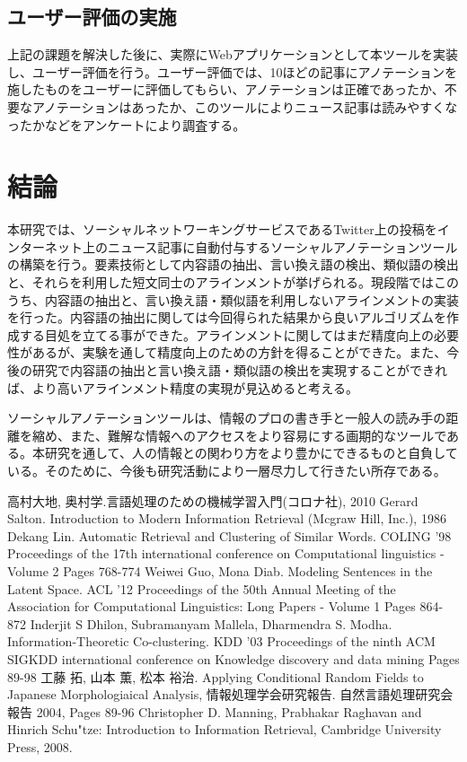 \documentclass[12pt]{jarticle}
\begin{document}
\subsection{ユーザー評価の実施}
上記の課題を解決した後に、実際にWebアプリケーションとして本ツールを実装し、ユーザー評価を行う。ユーザー評価では、10ほどの記事にアノテーションを施したものをユーザーに評価してもらい、アノテーションは正確であったか、不要なアノテーションはあったか、このツールによりニュース記事は読みやすくなったかなどをアンケートにより調査する。

\section{結論}
本研究では、ソーシャルネットワーキングサービスであるTwitter上の投稿をインターネット上のニュース記事に自動付与するソーシャルアノテーションツールの構築を行う。要素技術として内容語の抽出、言い換え語の検出、類似語の検出と、それらを利用した短文同士のアラインメントが挙げられる。現段階ではこのうち、内容語の抽出と、言い換え語・類似語を利用しないアラインメントの実装を行った。内容語の抽出に関しては今回得られた結果から良いアルゴリズムを作成する目処を立てる事ができた。アラインメントに関してはまだ精度向上の必要性があるが、実験を通して精度向上のための方針を得ることができた。また、今後の研究で内容語の抽出と言い換え語・類似語の検出を実現することができれば、より高いアラインメント精度の実現が見込めると考える。

ソーシャルアノテーションツールは、情報のプロの書き手と一般人の読み手の距離を縮め、また、難解な情報へのアクセスをより容易にする画期的なツールである。本研究を通して、人の情報との関わり方をより豊かにできるものと自負している。そのために、今後も研究活動により一層尽力して行きたい所存である。

\newpage
\pagestyle{empty}
\begin{thebibliography}{9}
   高村大地, 奥村学.言語処理のための機械学習入門(コロナ社), 2010
   Gerard Salton. Introduction to Modern Information Retrieval (Mcgraw Hill, Inc.), 1986
   Dekang Lin. Automatic Retrieval and Clustering of Similar Words. COLING '98 Proceedings of the 17th international conference on Computational linguistics - Volume 2 Pages 768-774
   Weiwei Guo, Mona Diab. Modeling Sentences in the Latent Space. ACL '12 Proceedings of the 50th Annual Meeting of the Association for Computational Linguistics: Long Papers - Volume 1
Pages 864-872
   Inderjit S Dhilon, Subramanyam Mallela, Dharmendra S. Modha. Information-Theoretic Co-clustering. KDD '03 Proceedings of the ninth ACM SIGKDD international conference on Knowledge discovery and data mining
Pages 89-98
  工藤 拓, 山本 薫, 松本 裕治. Applying Conditional Random Fields to Japanese Morphologiaical Analysis, 情報処理学会研究報告. 自然言語処理研究会報告 2004, Pages 89-96
  Christopher D. Manning, Prabhakar Raghavan and Hinrich Schu"tze: Introduction to Information Retrieval, Cambridge University Press, 2008.
\end{thebibliography}
\end{document}
